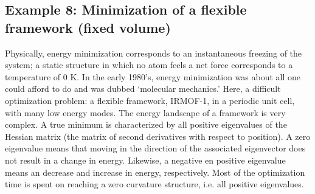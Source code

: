 \subsection*{Example 8: Minimization of a flexible framework (fixed volume)}

Physically, energy minimization corresponds to an instantaneous freezing of the system; a static structure in 
which no atom feels a net force corresponds to a temperature of 0 K. In the early 1980's, energy minimization was 
about all one could afford to do and was dubbed `molecular mechanics.' Here, a difficult optimization problem:
a flexible framework, IRMOF-1, in a periodic unit cell, with many low energy modes.
The energy landscape of a framework is very complex. A true minimum is characterized by
all positive eigenvalues of the Hessian matrix (the matrix of second derivatives with respect to position). A
zero eigenvalue means that moving in the direction of the associated eigenvector does not result in a change in
energy. Likewise, a negative en positive eigenvalue means an decrease and increase in energy, respectively.
Most of the optimization time is spent on reaching a zero curvature structure, i.e. all positive eigenvalues.

